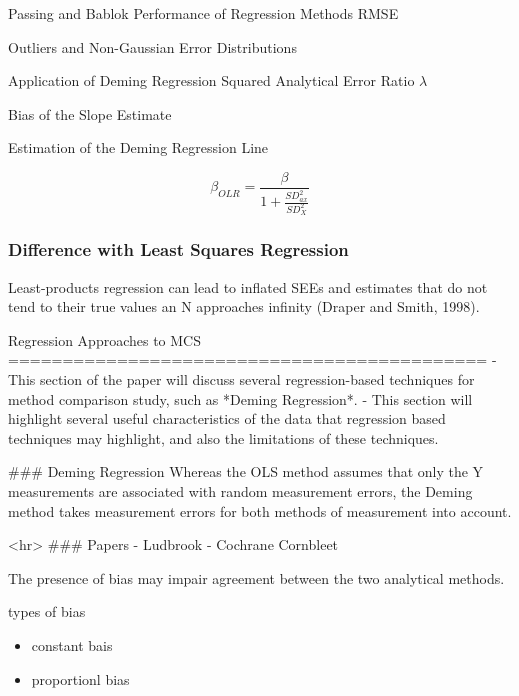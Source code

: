 

Passing and Bablok
Performance of Regression Methods
RMSE

Outliers and Non-Gaussian Error Distributions


Application of Deming Regression
Squared Analytical Error Ratio $\lambda$

Bias of the Slope Estimate

Estimation of the Deming Regression Line

\[ \beta_{OLR} =  \frac{\beta}{1 + \frac{SD^2_{ax}}{SD^2_{X}}}\]
\newpage

\subsubsection{Difference with Least Squares Regression}
Least-products regression can lead to inflated SEEs and estimates
that do not tend to their true values an N approaches infinity
(Draper and Smith, 1998).

\newpage
Regression Approaches to MCS
============================================
- This section of the paper will discuss several regression-based techniques for method comparison study, 
such as *Deming Regression*. 
- This section will highlight several useful characteristics of the data that 
regression based techniques may highlight, and also the limitations of these techniques.

### Deming Regression
Whereas the OLS method assumes that only the Y measurements are associated with 
random measurement errors, the Deming method takes measurement errors for both methods of measurement into account.

<hr>
### Papers
- Ludbrook
- Cochrane Cornbleet



The presence of bias may impair agreement between the two analytical methods.

types of bias

\begin{itemize}
	\item constant bais
	\item proportionl bias
\end{itemize}

